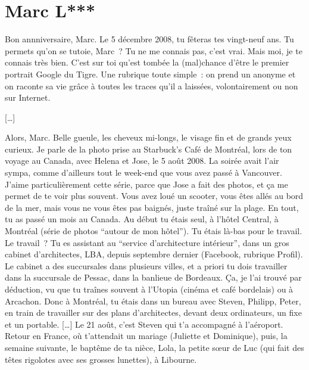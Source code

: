 \section{Marc L***}

Bon annniversaire, Marc. Le 5 décembre 2008, tu fêteras tes vingt-neuf ans. Tu permets qu'on se tutoie, Marc ? Tu ne me connais pas, c'est vrai. Mais moi, je te connais très bien. C'est sur toi qu'est tombée la (mal)chance d'être le premier portrait Google du Tigre. Une rubrique toute simple : on prend un anonyme et on raconte sa vie grâce à toutes les traces qu'il a laissées, volontairement ou non sur Internet.

[…]

Alors, Marc. Belle gueule, les cheveux mi-longs, le visage fin et de grands yeux curieux. Je parle de la photo prise au Starbuck's Café de Montréal, lors de ton voyage au Canada, avec Helena et Jose, le 5 août 2008. La soirée avait l'air sympa, comme d'ailleurs tout le week-end que vous avez passé à Vancouver. J'aime particulièrement cette série, parce que Jose a fait des photos, et ça me permet de te voir plus souvent. Vous avez loué un scooter, vous êtes allés au bord de la mer, mais vous ne vous êtes pas baignés, juste traîné sur la plage. En tout, tu as passé un mois au Canada. Au début tu étais seul, à l'hôtel Central, à Montréal (série de photos \enquote{autour de mon hôtel}). Tu étais là-bas pour le travail. Le travail ? Tu es assistant au \enquote{service d'architecture intérieur}, dans un gros cabinet d'architectes, LBA, depuis septembre dernier (Facebook, rubrique Profil). Le cabinet a des succursales dans plusieurs villes, et a priori tu dois travailler dans la succursale de Pessac, dans la banlieue de Bordeaux. Ça, je l'ai trouvé par déduction, vu que tu traînes souvent à l'Utopia (cinéma et café bordelais) ou à Arcachon. Donc à Montréal, tu étais dans un bureau avec Steven, Philipp, Peter, en train de travailler sur des plans d'architectes, devant deux ordinateurs, un fixe et un portable. […] Le 21 août, c'est Steven qui t'a accompagné à l'aéroport. Retour en France, où t'attendait un mariage (Juliette et Dominique), puis, la semaine suivante, le baptême de ta nièce, Lola, la petite sœur de Luc (qui fait des têtes rigolotes avec ses grosses lunettes), à Libourne.

